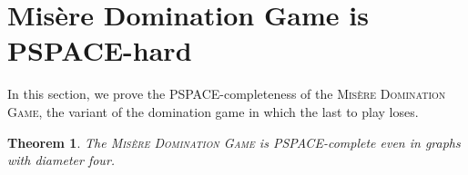 \documentclass[12pt]{article}
\newtheorem{theorem}{Theorem}[section]
\begin{document}
\section{Misère Domination Game is PSPACE-hard}\label{sec:path-cycle}

In this section, we prove the PSPACE-completeness of the \textsc{Misère Domination Game}, the variant of the domination game in which the last to play loses.

\begin{theorem}\label{thm-pspace-misere}
The \textsc{Misère Domination Game} is \emph{PSPACE}-complete even in graphs with diameter four.
\end{theorem}
\end{document}
